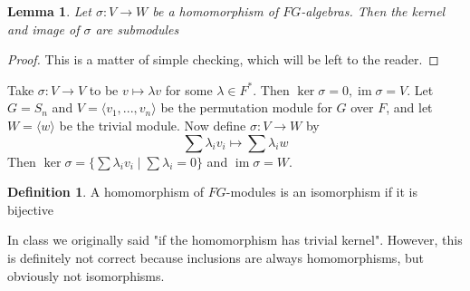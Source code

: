 \documentclass[11pt, notitlepage]{article}
\numberwithin{equation}{section}
\theoremstyle{plain}
\newtheorem{lemma}[theorem]{Lemma}
\theoremstyle{definition}
\newtheorem{definition}[theorem]{Definition}
\newenvironment{remark}
	{\pushQED{\qed}\renewcommand{\qedsymbol}{$\blacklozenge$}\remarkx}
	{\popQED\endremarkx}
\newenvironment{example}
	{\pushQED{\qed}\renewcommand{\qedsymbol}{$\blacktriangleleft$}\examplex}
	{\popQED\endexamplex}
\DeclareMathOperator{\im}{im}
\begin{document}
\begin{lemma}
	Let $\sigma: V \rightarrow W$ be a homomorphism of $FG$-algebras. Then the kernel and image of $\sigma$ are submodules
\end{lemma}
\begin{proof}
	This is a matter of simple checking, which will be left to the reader.
\end{proof}

\begin{example}
	Take $\sigma: V \rightarrow V$ to be $v \mapsto \lambda v$ for some $\lambda \in F^*$. Then $\ker \sigma = 0, \im \sigma = V$. 
\end{example}
\begin{example}
	Let $G = S_n$ and $V = \langle v_1,..., v_n \rangle$ be the permutation module for $G$ over $F$, and let $W = \langle w \rangle$ be the trivial module. Now define $\sigma: V \rightarrow W$ by $$\sum \lambda_i v_i \mapsto \sum \lambda_i w$$ Then $\ker \sigma = \{\sum \lambda_i v_i \mid \sum \lambda_i = 0\}$ and $\im \sigma = W$. 
\end{example}

\begin{definition}
	A homomorphism of $FG$-modules is an isomorphism if it is bijective
\end{definition}
\begin{remark}
	In class we originally said "if the homomorphism has trivial kernel". However, this is definitely not correct because inclusions are always homomorphisms, but obviously not isomorphisms. 
\end{remark}
\end{document}
